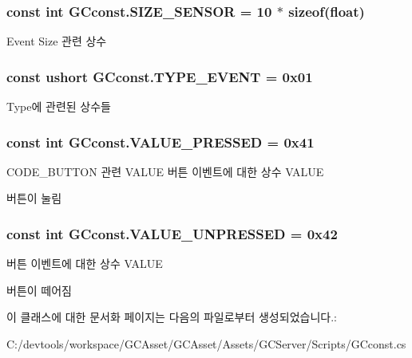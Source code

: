 \subsubsection[{S\+I\+Z\+E\+\_\+\+S\+E\+N\+S\+O\+R}]{\setlength{\rightskip}{0pt plus 5cm}const int G\+Cconst.\+S\+I\+Z\+E\+\_\+\+S\+E\+N\+S\+O\+R = 10 $\ast$ sizeof(float)}\label{class_g_cconst_a13a353e3da52e3a0454487664c360dab}
Event Size 관련 상수 \hypertarget{class_g_cconst_a5653aff2918dd19b3ed466d054916b51}{}
\subsubsection[{T\+Y\+P\+E\+\_\+\+E\+V\+E\+N\+T}]{\setlength{\rightskip}{0pt plus 5cm}const ushort G\+Cconst.\+T\+Y\+P\+E\+\_\+\+E\+V\+E\+N\+T = 0x01}\label{class_g_cconst_a5653aff2918dd19b3ed466d054916b51}
Type에 관련된 상수들 \hypertarget{class_g_cconst_ab29addae403721e28db58d3d588d7cb6}{}
\subsubsection[{V\+A\+L\+U\+E\+\_\+\+P\+R\+E\+S\+S\+E\+D}]{\setlength{\rightskip}{0pt plus 5cm}const int G\+Cconst.\+V\+A\+L\+U\+E\+\_\+\+P\+R\+E\+S\+S\+E\+D = 0x41}\label{class_g_cconst_ab29addae403721e28db58d3d588d7cb6}
C\+O\+D\+E\+\_\+\+B\+U\+T\+T\+O\+N 관련 V\+A\+L\+U\+E 버튼 이벤트에 대한 상수 V\+A\+L\+U\+E

버튼이 눌림 \hypertarget{class_g_cconst_ae71573553c10f6fa0dce4c8ef2a27e10}{}
\subsubsection[{V\+A\+L\+U\+E\+\_\+\+U\+N\+P\+R\+E\+S\+S\+E\+D}]{\setlength{\rightskip}{0pt plus 5cm}const int G\+Cconst.\+V\+A\+L\+U\+E\+\_\+\+U\+N\+P\+R\+E\+S\+S\+E\+D = 0x42}\label{class_g_cconst_ae71573553c10f6fa0dce4c8ef2a27e10}
버튼 이벤트에 대한 상수 V\+A\+L\+U\+E

버튼이 떼어짐 

이 클래스에 대한 문서화 페이지는 다음의 파일로부터 생성되었습니다.\+:\begin{DoxyCompactItemize}
\item 
C\+:/devtools/workspace/\+G\+C\+Asset/\+G\+C\+Asset/\+Assets/\+G\+C\+Server/\+Scripts/G\+Cconst.\+cs\end{DoxyCompactItemize}
